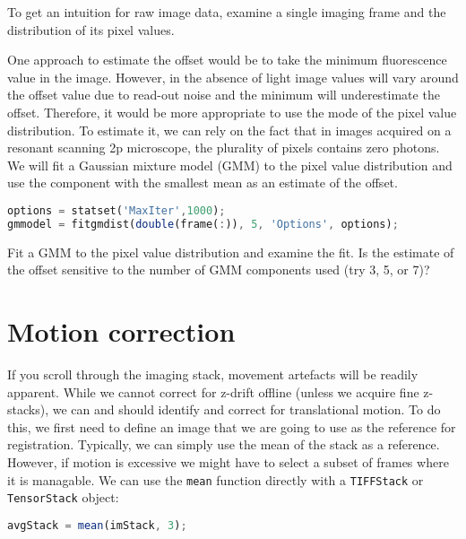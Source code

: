 \documentclass[a4paper]{report}
\newcommand{\nexercise}[0]{\arabic{exercises}\addtocounter{exercises}{1}}
\begin{document}
\begin{exercisebox}[frametitle={Exercise \nexercise: Pixel value distribution}]
To get an intuition for raw image data, examine a single imaging frame and the distribution of its pixel values.
\end{exercisebox}

One approach to estimate the offset would be to take the minimum fluorescence value in the image. 
However, in the absence of light image values will vary around the offset value due to read-out noise and the minimum will underestimate the offset. 
Therefore, it would be more appropriate to use the mode of the pixel value distribution. 
To estimate it, we can rely on the fact that in images acquired on a resonant scanning 2p microscope, the plurality of pixels contains zero photons. 
We will fit a Gaussian mixture model (GMM) to the pixel value distribution and use the component with the smallest mean as an estimate of the offset.
\begin{lstlisting}[language=Octave]
% fit GMM with 5 Gaussians
options = statset('MaxIter',1000);
gmmodel = fitgmdist(double(frame(:)), 5, 'Options', options);
\end{lstlisting}

\begin{exercisebox}[frametitle={Exercise \nexercise: GMM for offset estimation}]
Fit a GMM to the pixel value distribution and examine the fit. Is the estimate of the offset sensitive to the number of GMM components used (try 3, 5, or 7)?
\end{exercisebox}

\section{Motion correction}
If you scroll through the imaging stack, movement artefacts will be readily apparent.
While we cannot correct for z-drift offline (unless we acquire fine z-stacks), we can and should identify and correct for translational motion. 
To do this, we first need to define an image that we are going to use as the reference for registration.
Typically, we can simply use the mean of the stack as a reference.
However, if motion is excessive we might have to select a subset of frames where it is managable.
We can use the \texttt{mean} function directly with a \texttt{TIFFStack} or \texttt{TensorStack} object:
\begin{lstlisting}[language=Octave]
avgStack = mean(imStack, 3);
\end{lstlisting}
\end{document}
